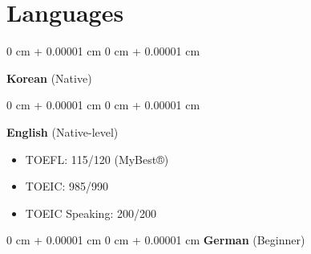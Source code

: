 \documentclass[11pt, letterpaper]{article}
\newenvironment{highlights}{
    \begin{itemize}[
        topsep=0.10 cm,
        parsep=0.10 cm,
        partopsep=0pt,
        itemsep=0pt,
        leftmargin=0 cm + 10pt
    ]
}{
    \end{itemize}
} %
\newenvironment{onecolentry}{
    \Needspace{3\baselineskip}
    \begin{adjustwidth}{
        0 cm + 0.00001 cm
    }{
        0 cm + 0.00001 cm
    }
}{
    \end{adjustwidth}
} %
\begin{document}
\section{Languages}
    
        \begin{onecolentry}
        \textbf{Korean} (Native)  
        \end{onecolentry}
         \vspace{0.15 cm}
        \begin{onecolentry}
        \textbf{English} (Native-level) \\
            \begin{highlights}
                \item TOEFL: 115/120 (MyBest®)
                \item TOEIC: 985/990
                \item TOEIC Speaking: 200/200
            \end{highlights}
        \end{onecolentry}
         \vspace{0.15 cm}
        \begin{onecolentry}{}
        \textbf{German} (Beginner) \\
        \end{onecolentry}
\end{document}
